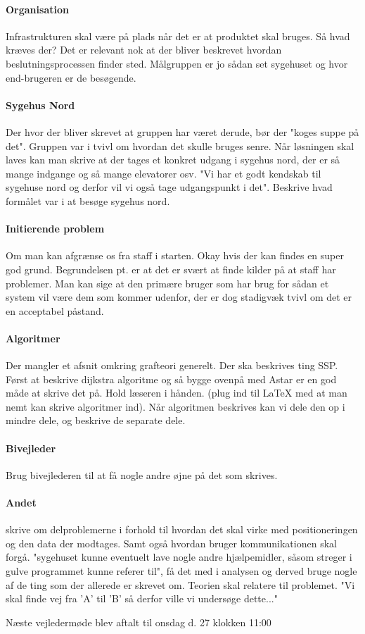 \documentclass[article,11pt]{memoir}
\begin{document}
\paragraph{Organisation}
Infrastrukturen skal være på plads når det er at produktet skal bruges. Så hvad kræves der? Det er relevant nok at der bliver beskrevet hvordan beslutningsprocessen finder sted. Målgruppen er jo sådan set sygehuset og hvor end-brugeren er de besøgende. 


\paragraph{Sygehus Nord}
Der hvor der bliver skrevet at gruppen har været derude, bør der "koges suppe på det". 
Gruppen var i tvivl om hvordan det skulle bruges senre. Når løsningen skal laves kan man skrive at der tages et konkret udgang i sygehus nord, der er så mange indgange og så mange elevatorer osv. "Vi har et godt kendskab til sygehuse nord og derfor vil vi også tage udgangspunkt i det".
Beskrive hvad formålet var i at besøge sygehus nord.


\paragraph{Initierende problem}
Om man kan afgrænse os fra staff i starten. Okay hvis der kan findes en super god grund. Begrundelsen pt. er at det er svært at finde kilder på at staff har problemer. Man kan sige at den primære bruger som har brug for sådan et system vil være dem som kommer udenfor, der er dog stadigvæk tvivl om det er en acceptabel påstand. 


\paragraph{Algoritmer}
Der mangler et afsnit omkring grafteori generelt. Der ska beskrives ting SSP. Først at beskrive dijkstra algoritme og så bygge ovenpå med Astar er en god måde at skrive det på. Hold læseren i hånden. (plug ind til LaTeX med at man nemt kan skrive algoritmer ind). Når algoritmen beskrives kan vi dele den op i mindre dele, og beskrive de separate dele.  


\paragraph{Bivejleder}
Brug bivejlederen til at få nogle andre øjne på det som skrives.


\paragraph{Andet}
skrive om delproblemerne i forhold til hvordan det skal virke med positioneringen og den data der modtages. Samt også hvordan bruger kommunikationen skal forgå. "sygehuset kunne eventuelt lave nogle andre hjælpemidler, såsom streger i gulve programmet kunne referer til", få det med i analysen og derved bruge nogle af de ting som der allerede er skrevet om. 
Teorien skal relatere til problemet. "Vi skal finde vej fra 'A' til 'B' så derfor ville vi undersøge dette..."



Næste vejledermøde blev aftalt til onsdag d. 27 klokken 11:00 
\end{document}
